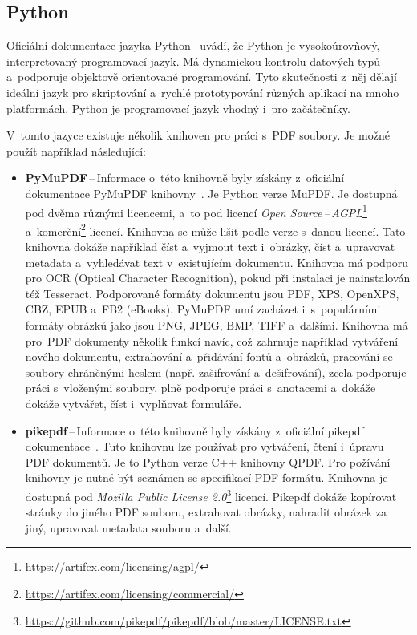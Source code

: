 \subsection*{Python} \label{python_libraries}

Oficiální dokumentace jazyka Python~\cite{Python} uvádí, že Python je 
vysokoúrovňový, interpretovaný programovací jazyk. Má dynamickou
kontrolu datových typů a~podporuje objektově orientované programování. Tyto
skutečnosti z~něj dělají ideální jazyk pro skriptování a~rychlé prototypování
různých aplikací na mnoho platformách. Python je programovací jazyk vhodný i~pro
začátečníky.

V~tomto jazyce existuje několik knihoven pro práci s~PDF soubory. Je možné použít
například následující: 
\begin{itemize}
    \item \textbf{PyMuPDF}\,--\,Informace o~této knihovně byly získány
    z~oficiální dokumentace PyMuPDF kni\-hov\-ny~\cite{PyMuPDF}.
    Je Python verze MuPDF. Je dostupná pod dvěma různými licencemi, a~to pod
    licencí \emph{Open Source\,--\,AGPL}\footnote{
    \href{https://artifex.com/licensing/agpl/}{https://artifex.com/licensing/agpl/}
    } a~komerční\footnote{
    \href{https://artifex.com/licensing/commercial/}{https://artifex.com/licensing/commercial/}
    } licencí. Knihovna se může lišit podle verze s~danou licencí. Tato knihovna
    dokáže například číst a~vyjmout text i~obrázky, číst a~upravovat
    metadata a~vyhledávat text v~existujícím dokumentu.
    Knihovna má podporu pro OCR (Optical Character Recognition), pokud při
    instalaci je nainstalován též Tesseract. Podporované formáty dokumentu jsou
    PDF, XPS, OpenXPS, CBZ, EPUB a~FB2 (eBooks). PyMuPDF umí zacházet
    i~s~populárními formáty obrázků jako jsou PNG, JPEG, BMP, TIFF a~dalšími.
    Knihovna má pro~PDF dokumenty několik funkcí navíc,
    což zahrnuje například vytváření nového dokumentu, extrahování a~přidávání
    fontů a~obrázků, pracování se soubory chráněnými heslem (např. zašifrování 
    a~dešifrování), zcela podporuje práci s~vloženými soubory, plně podporuje 
    práci s~anotacemi a~dokáže dokáže vytvářet, číst i~vyplňovat formuláře.

    \item \textbf{pikepdf}\,--\,Informace o~této knihovně byly získány
    z~oficiální pikepdf dokumentace~\cite{pikepdf}.
    Tuto knihovnu lze používat pro vytváření, čtení i~úpravu PDF dokumentů.
    Je to Python verze C++ knihovny QPDF. Pro požívání knihovny je nutné být
    seznámen se specifikací PDF formátu. Knihovna je dostupná pod
    \emph{Mozilla Public License 2.0}\footnote{
    \href{https://github.com/pikepdf/pikepdf/blob/master/LICENSE.txt}{https://github.com/pikepdf/pikepdf/blob/master/LICENSE.txt}
    } licencí. Pikepdf dokáže kopírovat stránky do jiného PDF souboru, extrahovat
    obrázky, nahradit obrázek za jiný, upravovat metadata souboru a~další.

\end{itemize}


